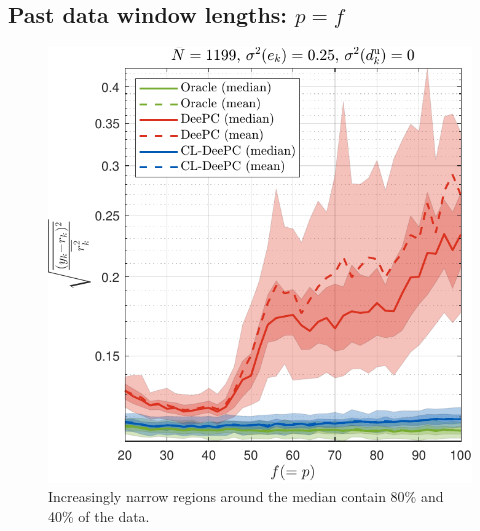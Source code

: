\subsection{Past data window lengths: $p=f$}
\begin{figure}[b!]
\begin{center}
\includegraphics[width=\columnwidth]{results/figures/Varying_pf_20-100-41_Nbar_1199_Re_0.25_Ru_1_Rdu_0_Q_100_R_0_dR_10.pdf}    %
\caption{Increasingly narrow regions around the median contain 80\% and 40\% of the data.}  %
\label{fig:varying_Re}                                 %
\end{center}                                 %
\end{figure}
